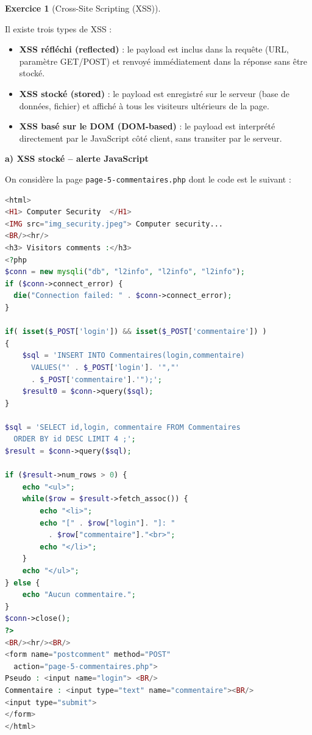 \documentclass[a4paper,11pt]{article}
\theoremstyle{plain}
\theoremstyle{definition}
\newtheorem{exercice}{Exercice}
\begin{document}
\begin{exercice}[Cross-Site Scripting (XSS)]

\begin{rappel}
Il existe trois types de XSS :
\begin{itemize}
    \item \textbf{XSS réfléchi (reflected)} : le payload est inclus dans la requête (URL, paramètre GET/POST) et renvoyé immédiatement dans la réponse sans être stocké.
    \item \textbf{XSS stocké (stored)} : le payload est enregistré sur le serveur (base de données, fichier) et affiché à tous les visiteurs ultérieurs de la page.
    \item \textbf{XSS basé sur le DOM (DOM-based)} : le payload est interprété directement par le JavaScript côté client, sans transiter par le serveur.
\end{itemize}
\end{rappel}

\medskip

\textbf{a) XSS stocké -- alerte JavaScript}

\medskip

On considère la page \texttt{page-5-commentaires.php} dont le code est le suivant :

\begin{lstlisting}[language=PHP]
<html>
<H1> Computer Security  </H1>
<IMG src="img_security.jpeg"> Computer security...
<BR/><hr/>
<h3> Visitors comments :</h3>
<?php
$conn = new mysqli("db", "l2info", "l2info", "l2info");
if ($conn->connect_error) {
  die("Connection failed: " . $conn->connect_error);
}

if( isset($_POST['login']) && isset($_POST['commentaire']) )
{
    $sql = 'INSERT INTO Commentaires(login,commentaire)
      VALUES("' . $_POST['login']. '","'
      . $_POST['commentaire'].'");';
    $result0 = $conn->query($sql);
}

$sql = 'SELECT id,login, commentaire FROM Commentaires
  ORDER BY id DESC LIMIT 4 ;';
$result = $conn->query($sql);

if ($result->num_rows > 0) {
    echo "<ul>";
    while($row = $result->fetch_assoc()) {
        echo "<li>";
        echo "[" . $row["login"]. "]: "
          . $row["commentaire"]."<br>";
        echo "</li>";
    }
    echo "</ul>";
} else {
    echo "Aucun commentaire.";
}
$conn->close();
?>
<BR/><hr/><BR/>
<form name="postcomment" method="POST"
  action="page-5-commentaires.php">
Pseudo : <input name="login"> <BR/>
Commentaire : <input type="text" name="commentaire"><BR/>
<input type="submit">
</form>
</html>
\end{lstlisting}


\end{exercice}
\end{document}
